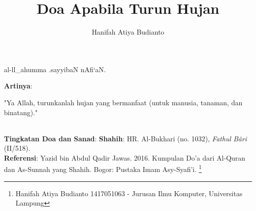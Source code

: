 \documentclass[a4paper,12pt]{article}
\title{\LARGE Doa Apabila Turun Hujan}
\author{\calligra Hanifah Atiya Budianto}
\begin{document}
\sffamily
\maketitle 
\fullvocalize
{}
\begin{arabtext}
\noindent
al-ll_ahumma .sayyibaN nAfi`aN.\\
\end{arabtext}
\noindent
\textbf{Artinya}:
\par
\indent
"Ya Allah, turunkanlah hujan yang bermanfaat (untuk manusia, tanaman, dan 
binatang)."\\\\
\par
\noindent
\textbf{Tingkatan Doa dan Sanad}: \textbf{Shahih}: HR. Al-Bukhari (no. 
1032), \textit{Fathul B\^{a}ri} (II/518).\\
\textbf{Referensi}: Yazid bin Abdul Qadir Jawas. 2016. Kumpulan Do'a dari
Al-Quran dan As-Sunnah yang Shahih. Bogor: Pustaka Imam Asy-Syafi'i.
\footnote{Hanifah Atiya Budianto 1417051063 - Jurusan Ilmu Komputer,
Universitas Lampung}
\end{document}
